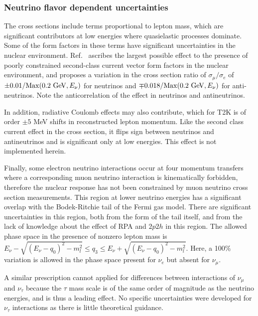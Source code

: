 \subsubsection{Neutrino flavor dependent uncertainties}
The cross sections include terms proportional to lepton mass, which are significant contributors at low energies where quasielastic processes dominate.  Some of the form factors in these terms have significant uncertainties in the nuclear environment.  Ref.~\cite{Day-McFarland:2012} ascribes the largest possible effect to the presence of poorly constrained second-class current vector form factors in the nuclear environment, and proposes a variation in the cross section ratio of $\sigma_\mu/\sigma_e$ of $\pm 0.01/{\rm\textstyle Max}(0.2~{\rm\textstyle GeV},E_\nu)$ for neutrinos and $\mp 0.018/{\rm\textstyle Max}(0.2~ {\rm\textstyle GeV},E_\nu)$ for anti-neutrinos.  Note the anticorrelation of the effect in neutrinos and antineutrinos.

In addition, radiative Coulomb effects may also contribute, which for T2K is of order $\pm5$ MeV shifts in reconstructed lepton momentum.  Like the second class current effect in the cross section, it flips sign between neutrinos and antineutrinos and is significant only at low energies.  This effect is not implemented herein.

Finally, some electron neutrino interactions occur at four momentum transfers where a corresponding muon neutrino interaction is kinematically forbidden, therefore the nuclear response has not been constrained by muon neutrino cross section measurements.  This region at lower neutrino energies has a significant overlap with the Bodek-Ritchie tail of the Fermi gas model. There are significant uncertainties in this region, both from the form of the tail itself, and from the lack of knowledge about the effect of RPA and $2p2h$ in this region. The allowed phase space in the presence of nonzero lepton mass is $E_\nu-\sqrt{\left( E_\nu-q_0\right) ^2-m_l^2}\leq q_3\leq E_\nu+\sqrt{\left( E_\nu-q_0\right) ^2-m_l^2}$. Here, a 100\% variation is allowed in the phase space present for $\nu_e$ but absent for $\nu_\mu$.

A similar prescription cannot applied for differences between interactions of $\nu_\mu$ and $\nu_\tau$ because the $\tau$ mass scale is of the same order of magnitude as the neutrino energies, and is thus a leading effect. No specific uncertainties were developed for $\nu_\tau$ interactions as there is little theoretical guidance.


